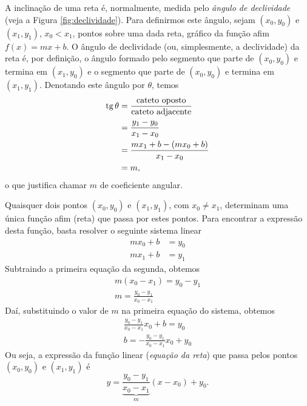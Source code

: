 A inclinação de uma reta é, normalmente, medida pelo \emph{ângulo de declividade} (veja a Figura \ref{fig:declividade}). Para definirmos este ângulo, sejam $(x_0, y_0)$ e $(x_1, y_1)$, $x_0<x_1$, pontos sobre uma dada reta, gráfico da função afim $f(x)=mx+b$. O ângulo de declividade (ou, simplesmente, a declividade) da reta é, por definição, o ângulo formado pelo segmento que parte de $(x_0, y_0)$ e termina em $(x_1, y_0)$ e o segmento que parte de $(x_0, y_0)$ e termina em $(x_1, y_1)$. Denotando este ângulo por $\theta$, temos
\begin{align}
  \operatorname{tg}\theta &= \frac{\text{cateto oposto}}{\text{cateto adjacente}}\\
            &= \frac{y_1-y_0}{x_1-x_0}\\
            &= \frac{mx_1+b-(mx_0+b)}{x_1-x_0}\\
            &= m,
\end{align}
o que justifica chamar $m$ de coeficiente angular.

Quaisquer dois pontos $(x_0, y_0)$ e $(x_1, y_1)$, com $x_0\neq x_1$, determinam uma única função afim (reta) que passa por estes pontos. Para encontrar a expressão desta função, basta resolver o seguinte sistema linear
\begin{align}
  mx_0 + b &= y_0\\
  mx_1 + b &= y_1
\end{align}
Subtraindo a primeira equação da segunda, obtemos
\begin{gather}
  m(x_0-x_1) = y_0-y_1\\
  m = \frac{y_0-y_1}{x_0-x_1}
\end{gather}
Daí, substituindo o valor de $m$ na primeira equação do sistema, obtemos
\begin{gather}
  \frac{y_0-y_1}{x_0-x_1}x_0 + b = y_0 \\
  b = -\frac{y_0-y_1}{x_0-x_1}x_0 + y_0
\end{gather}
Ou seja, a expressão da função linear (\emph{equação da reta}) que passa pelos pontos $(x_0, y_0)$ e $(x_1, y_1)$ é
\begin{equation}\label{eq:funafim_eq}
  y = \underbrace{\frac{y_0-y_1}{x_0-x_1}}_{m}(x-x_0) + y_0.
\end{equation}

